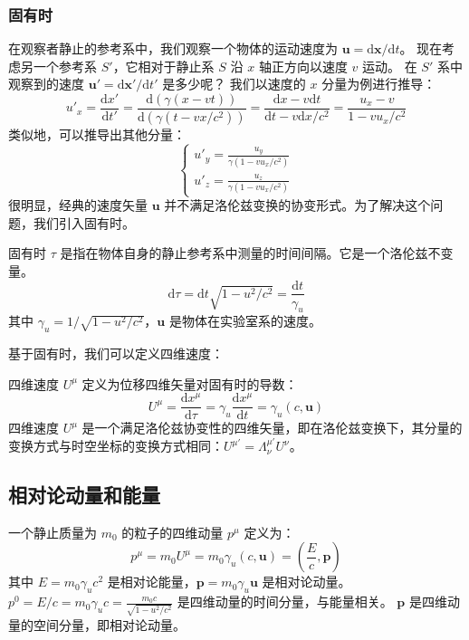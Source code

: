 \documentclass[fontset=none]{ctexart}
\begin{document}
\subsubsection{固有时}
在观察者静止的参考系中，我们观察一个物体的运动速度为 $\bm{u} = \mathrm{d}\bm{x}/\mathrm{d}t$。
现在考虑另一个参考系 $S'$，它相对于静止系 $S$ 沿 $x$ 轴正方向以速度 $v$ 运动。
在 $S'$ 系中观察到的速度 $\bm{u}' = \mathrm{d}\bm{x}'/\mathrm{d}t'$ 是多少呢？
我们以速度的 $x$ 分量为例进行推导：
\begin{equation}
u'_x = \frac{\mathrm{d}x'}{\mathrm{d}t'} = \frac{\mathrm{d}(\gamma(x - vt))}{\mathrm{d}(\gamma(t - vx/c^2))} 
= \frac{\mathrm{d}x - v\mathrm{d}t}{\mathrm{d}t - v\mathrm{d}x/c^2} = \frac{u_x - v}{1 - vu_x/c^2}
\end{equation}
类似地，可以推导出其他分量：
\begin{equation}
\begin{cases} 
u'_y = \frac{u_y}{\gamma(1-vu_x/c^2)} \\
u'_z = \frac{u_z}{\gamma(1-vu_x/c^2)}
\end{cases}
\end{equation}
很明显，经典的速度矢量 $\bm{u}$ 并不满足洛伦兹变换的协变形式。为了解决这个问题，我们引入固有时。
\begin{definition}[固有时]
固有时 $\tau$ 是指在物体自身的静止参考系中测量的时间间隔。它是一个洛伦兹不变量。
\begin{equation}
\mathrm{d}\tau = \mathrm{d}t \sqrt{1 - u^2/c^2} = \frac{\mathrm{d}t}{\gamma_u}
\end{equation}
其中 $\gamma_u = 1/\sqrt{1 - u^2/c^2}$，$\bm{u}$ 是物体在实验室系的速度。
\end{definition}
基于固有时，我们可以定义四维速度：
\begin{definition}[四维速度]
四维速度 $U^{\mu}$ 定义为位移四维矢量对固有时的导数：
\begin{equation}
U^{\mu} = \frac{\mathrm{d}x^{\mu}}{\mathrm{d}\tau} = \gamma_u \frac{\mathrm{d}x^{\mu}}{\mathrm{d}t} = \gamma_u (c, \bm{u})
\end{equation}
四维速度 $U^{\mu}$ 是一个满足洛伦兹协变性的四维矢量，即在洛伦兹变换下，其分量的变换方式与时空坐标的变换方式相同：$U^{\mu'} = \Lambda^{\mu'}_{\nu} U^{\nu}$。
\end{definition}

\subsection{相对论动量和能量}
\begin{definition}[四维动量]
一个静止质量为 $m_0$ 的粒子的四维动量 $p^{\mu}$ 定义为：
\begin{equation}
p^{\mu} = m_0 U^{\mu} = m_0 \gamma_u (c, \bm{u}) = (\frac{E}{c}, \bm{p})
\end{equation}
其中 $E = m_0\gamma_u c^2$ 是相对论能量，$\bm{p} = m_0\gamma_u \bm{u}$ 是相对论动量。
$p^0 = E/c = m_0\gamma_u c = \frac{m_0c}{\sqrt{1-u^2/c^2}}$ 是四维动量的时间分量，与能量相关。
$\bm{p}$ 是四维动量的空间分量，即相对论动量。
\end{definition}
\end{document}
